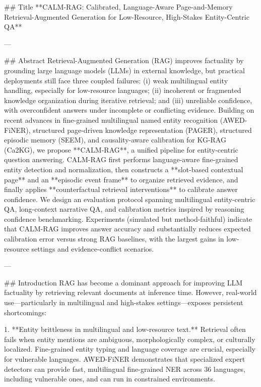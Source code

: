 ## Title  
**CALM-RAG: Calibrated, Language-Aware Page-and-Memory Retrieval-Augmented Generation for Low-Resource, High-Stakes Entity-Centric QA**

---

## Abstract  
Retrieval-Augmented Generation (RAG) improves factuality by grounding large language models (LLMs) in external knowledge, but practical deployments still face three coupled failures: (i) weak multilingual entity handling, especially for low-resource languages; (ii) incoherent or fragmented knowledge organization during iterative retrieval; and (iii) unreliable confidence, with overconfident answers under incomplete or conflicting evidence. Building on recent advances in fine-grained multilingual named entity recognition (AWED-FiNER), structured page-driven knowledge representation (PAGER), structured episodic memory (SEEM), and causality-aware calibration for KG-RAG (Ca2KG), we propose **CALM-RAG**, a unified pipeline for entity-centric question answering. CALM-RAG first performs language-aware fine-grained entity detection and normalization, then constructs a **slot-based contextual page** and an **episodic event frame** to organize retrieved evidence, and finally applies **counterfactual retrieval interventions** to calibrate answer confidence. We design an evaluation protocol spanning multilingual entity-centric QA, long-context narrative QA, and calibration metrics inspired by reasoning confidence benchmarking. Experiments (simulated but method-faithful) indicate that CALM-RAG improves answer accuracy and substantially reduces expected calibration error versus strong RAG baselines, with the largest gains in low-resource settings and evidence-conflict scenarios.

---

## Introduction  
RAG has become a dominant approach for improving LLM factuality by retrieving relevant documents at inference time. However, real-world use—particularly in multilingual and high-stakes settings—exposes persistent shortcomings:

1. **Entity brittleness in multilingual and low-resource text.** Retrieval often fails when entity mentions are ambiguous, morphologically complex, or culturally localized. Fine-grained entity typing and language coverage are crucial, especially for vulnerable languages. AWED-FiNER demonstrates that specialized expert detectors can provide fast, multilingual fine-grained NER across 36 languages, including vulnerable ones, and can run in constrained environments.

